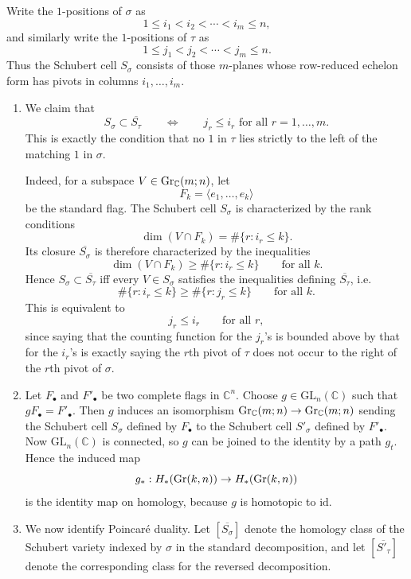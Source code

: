 \documentclass[12pt]{article}  %
\begin{document}
\begin{solution}
Write the $1$-positions of $\sigma$ as
\[
1\le i_1<i_2<\cdots<i_m\le n,
\]
and similarly write the $1$-positions of $\tau$ as
\[
1\le j_1<j_2<\cdots<j_m\le n.
\]
Thus the Schubert cell $S_\sigma$ consists of those $m$-planes whose row-reduced echelon form has pivots in columns $i_1,\dots,i_m$.

\begin{enumerate}
\item We claim that
\[
S_\sigma\subset \overline{S_\tau}
\qquad\Longleftrightarrow\qquad
j_r\le i_r \text{ for all } r=1,\dots,m.
\]
This is exactly the condition that no $1$ in $\tau$ lies strictly to the left of the matching $1$ in $\sigma$.

Indeed, for a subspace $V\in \operatorname{Gr}_{\mathbb{C}}(m;n)$, let
\[
F_k=\langle e_1,\dots,e_k\rangle
\]
be the standard flag. The Schubert cell $S_\sigma$ is characterized by the rank conditions
\[
\dim(V\cap F_k)=\#\{r: i_r\le k\}.
\]
Its closure $\overline{S_\sigma}$ is therefore characterized by the inequalities
\[
\dim(V\cap F_k)\ge \#\{r: i_r\le k\}
\qquad\text{for all }k.
\]
Hence $S_\sigma\subset \overline{S_\tau}$ iff every $V\in S_\sigma$ satisfies the inequalities defining $\overline{S_\tau}$, i.e.
\[
\#\{r:i_r\le k\}\ge \#\{r:j_r\le k\}
\qquad\text{for all }k.
\]
This is equivalent to
\[
j_r\le i_r\qquad\text{for all }r,
\]
since saying that the counting function for the $j_r$'s is bounded above by that for the $i_r$'s is exactly saying the $r$th pivot of $\tau$ does not occur to the right of the $r$th pivot of $\sigma$.

\item Let $F_\bullet$ and $F'_\bullet$ be two complete flags in $\mathbb{C}^n$. Choose $g \in \mathrm{GL}_n(\mathbb{C})$ such that
$gF_\bullet = F'_\bullet$. Then $g$ induces an isomorphism $\operatorname{Gr}_{\mathbb{C}}(m;n) \to \operatorname{Gr}_{\mathbb{C}}(m;n)$ sending the Schubert cell $S_\sigma$ defined by $F_\bullet$ to the Schubert cell $S'_\sigma$ defined by $F'_\bullet$. Now $\mathrm{GL}_n(\mathbb{C})$ is connected, so $g$ can be joined to the identity by a path $g_t$. Hence the induced map
\[
g_*: H_*(\operatorname{Gr}(k,n)) \to H_*(\operatorname{Gr}(k,n))
\]
is the identity map on homology, because $g$ is homotopic to $\mathrm{id}$.

\item We now identify Poincar\'e duality. Let $[\overline{S_\sigma}]$ denote the homology class of the Schubert variety indexed by $\sigma$ in the standard decomposition, and let $[\overline{S'_\tau}]$ denote the corresponding class for the reversed decomposition.


\end{enumerate}
\end{solution}
\end{document}
